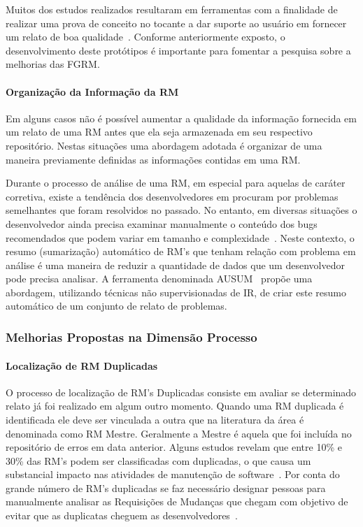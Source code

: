 Muitos dos estudos realizados resultaram em ferramentas com a finalidade de
realizar uma prova de conceito no tocante a dar suporte ao usuário em fornecer
um relato de boa qualidade~\cite{Tu:2014:MQI:2677832.2677844, Bettenburg2008a,
	Wu2011a,White:2015:GRR:2820282.2820291,moran2015auto}. Conforme
anteriormente exposto, o desenvolvimento deste protótipos é importante para
fomentar a pesquisa sobre a melhorias das FGRM\@.

\paragraph{Organização da Informação da RM}

	Em alguns casos não é possível aumentar a qualidade da informação fornecida em
um relato de uma RM antes que ela seja armazenada em seu respectivo repositório.
Nestas situações uma abordagem adotada é organizar de uma maneira previamente
definidas as informações contidas em uma RM\@.

Durante o processo de análise de uma RM, em especial para aquelas de caráter
corretiva, existe a tendência dos desenvolvedores em procuram por problemas
semelhantes que foram resolvidos no passado. No entanto, em diversas situações o
desenvolvedor ainda precisa examinar manualmente o conteúdo dos bugs
recomendados que podem variar em tamanho e complexidade~\cite{mani2012ausum}.
Neste contexto, o resumo (sumarização) automático de RM's que tenham relação com
problema em análise é uma maneira de reduzir a quantidade de dados que um
desenvolvedor pode precisa analisar. A ferramenta denominada
AUSUM~\cite{mani2012ausum} propõe uma abordagem, utilizando técnicas não
supervisionadas de IR, de criar este resumo automático de um conjunto de relato
de problemas.

\subsubsection{Melhorias Propostas na Dimensão Processo}
\label{ssub:melhorias_dim_processo}

\paragraph{Localização de RM Duplicadas}
O processo de localização de RM's Duplicadas consiste em avaliar se determinado
relato já foi realizado em algum outro momento. Quando uma RM duplicada é
identificada ele deve ser vinculada a outra que na literatura da área é
denominada como RM Mestre. Geralmente a Mestre é aquela que foi incluída no
repositório de erros em data anterior. Alguns estudos revelam que entre 10\% e
30\% das RM's podem ser classificadas com duplicadas, o que causa um substancial
impacto nas atividades de manutenção de
software~\cite{anvik2005coping,cavalcanti2013bug,Runeson:2007:DDD:1248820.1248882}.
Por conta do grande número de RM's duplicadas se faz necessário designar pessoas
para manualmente analisar as Requisições de Mudanças que chegam com objetivo de
evitar que as duplicatas cheguem as desenvolvedores~\cite{anvik2005coping}.

